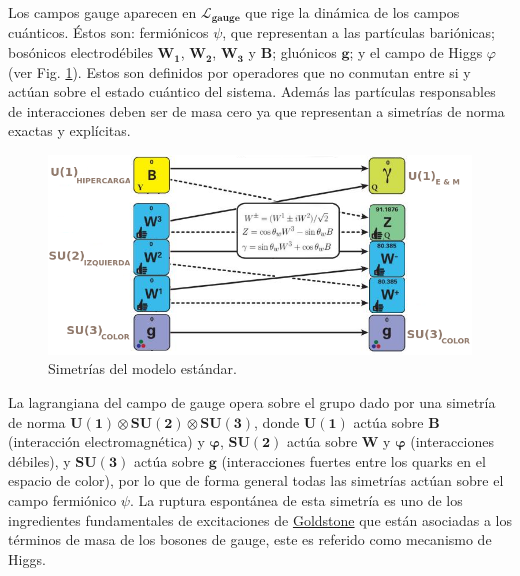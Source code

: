 Los campos gauge aparecen en $\mathcal{L}_{\mathbf{gauge}}$ que rige la dinámica de los campos cuánticos. Éstos son: fermiónicos $\psi$, que representan a las partículas bariónicas; bosónicos electrodébiles $\mathbf{W_1}$, $\mathbf{W_2} $, $\mathbf{W_3}$ y $\mathbf{B}$; gluónicos $\mathbf{g}$; y el campo de Higgs $\varphi$ (ver Fig. \ref{simetrias}). Estos son definidos por operadores que no conmutan entre si y actúan sobre el estado cuántico del sistema. Además las partículas responsables de interacciones deben ser de masa cero ya que representan a simetrías de norma exactas y explícitas.
 
\begin{figure}[!t]
\centering
\includegraphics[width=1\textwidth]{Fisica_de_Particulas/imagenes/simetria0.png}
\caption[Simetrías del modelo estándar]{Simetrías del modelo estándar.\footnotemark}
\label{simetrias}
\end{figure}

La lagrangiana del campo de gauge opera sobre el grupo dado por una simetría de norma $\mathbf{U(1) \otimes SU(2) \otimes SU(3)}$, donde $\mathbf{U(1)}$ actúa sobre $\mathbf{B}$ (interacción electromagnética) y $\mathbf{\varphi}$, $\mathbf{SU(2)}$ actúa sobre $\mathbf{W}$ y $\mathbf{\varphi}$ (interacciones débiles), y $\mathbf{SU(3)}$ actúa sobre $\mathbf{g}$ (interacciones fuertes entre los quarks en el espacio de color), por lo que de forma general todas las simetrías actúan sobre el campo fermiónico $\psi$.
La ruptura espontánea de esta simetría es uno de los ingredientes fundamentales de excitaciones de \href{https://es.wikipedia.org/wiki/Bos\%C3\%B3n\_de\_Goldstone}{Goldstone} que están asociadas a los términos de masa de los bosones de gauge, este es referido como mecanismo de Higgs.

